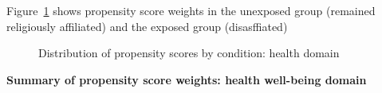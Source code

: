\documentclass[
  singlecolumn,
  9pt]{article}
\begin{document}
Figure~\ref{fig-results-health-propensity-dis} shows propensity score
weights in the unexposed group (remained religiously affiliated) and the
exposed group (disasffiated)

\begin{figure}


\caption{\label{fig-results-health-propensity-dis}Distribution of
propensity scores by condition: health domain}

\end{figure}%

\textbf{Summary of propensity score weights: health well-being domain}
\end{document}
